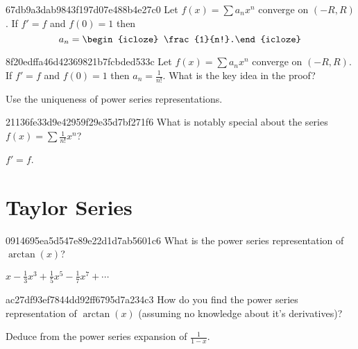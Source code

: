 \begin{note}{67db9a3dab9843f197d07e488b4e27c0}
    Let \({ f(x) = \sum a_n x^{n} }\) converge on \({ (-R, R) }\). If \({ f' = f }\) and \({ f(0) = 1 }\) then
    \[
        a_n = \begin{icloze}{1}\frac{1}{n!}.\end{icloze}
    \]
\end{note}

\begin{note}{8f20edffa46d42369821b7fcbded533c}
    Let \({ f(x) = \sum a_n x^{n} }\) converge on \({ (-R, R) }\). If \({ f' = f }\) and \({ f(0) = 1 }\) then \({ a_n = \frac{1}{n!} }\).
    What is the key idea in the proof?

    \begin{cloze}{1}
        Use the uniqueness of power series representations.
    \end{cloze}
\end{note}

\begin{note}{21136fe33d9e42959f29e35d7bf271f6}
    What is notably special about the series \({ f(x) = \sum \frac{1}{n!} x^{n} }\)?

    \begin{cloze}{1}
        \({ f' = f }\).
    \end{cloze}
\end{note}

\section{Taylor Series}
\begin{note}{0914695ea5d547e89e22d1d7ab5601c6}
    What is the power series representation of \({ \arctan(x) }\)?

    \begin{cloze}{1}
        \({ x - \frac{1}{3}x^{3} + \frac{1}{5}x^{5} - \frac{1}{7} x^{7} + \cdots }\)
    \end{cloze}
\end{note}

\begin{note}{ac27df93ef7844dd92ff6795d7a234c3}
    How do you find the power series representation of \({ \arctan(x) }\) (assuming no knowledge about it's derivatives)?

    \begin{cloze}{1}
        Deduce from the power series expansion of \({ \frac{1}{1-x} }\).
    \end{cloze}
\end{note}

